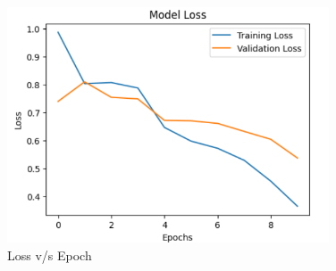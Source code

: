 \begin{figure}[h!]  
    \centering
    \includegraphics[width=0.85\textwidth]{Images/LSTM Loss v Epoch.png}  
    \caption{Loss v/s Epoch}
    \label{Loss vs Epoch LSTM}  %
\end{figure}

